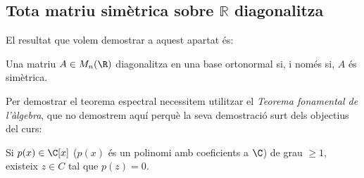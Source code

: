 \subsection{Tota matriu simètrica sobre \texorpdfstring{$\mathbb{R}$}{R} diagonalitza}
El resultat que volem demostrar a aquest apartat és:
\begin{teorema}
Una matriu $A\in M_n(\R)$ diagonalitza en una base ortonormal si, i només si, $A$ és simètrica.
\end{teorema}
Per demostrar el teorema espectral necessitem utilitzar el \emph{Teorema fonamental de l'àlgebra}, que no demostrem aquí perquè la seva demostració surt dels objectius del curs:
\begin{teorema}
Si $p(x)\in\C[x]$ ($p(x)$ és un polinomi amb coeficients a $\C$) de grau $\geq 1$, existeix $z\in C$ tal que $p(z)=0$.
\end{teorema}
